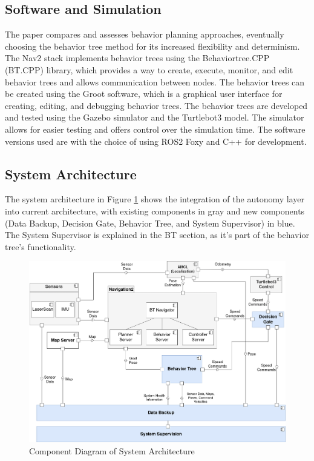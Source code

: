 \documentclass[letterpaper, 10pt, conference]{ieeeconf}
\begin{document}
\subsection{Software and Simulation}

The paper compares and assesses behavior planning approaches, eventually choosing the behavior tree method for its increased flexibility and determinism. The Nav2 stack implements behavior trees using the Behaviortree.CPP (BT.CPP) library, which provides a way to create, execute, monitor, and edit behavior trees and allows communication between nodes. The behavior trees can be created using the Groot software, which is a graphical user interface for creating, editing, and debugging behavior trees. The behavior trees are developed and tested using the Gazebo simulator and the Turtlebot3 model. The simulator allows for easier testing and offers control over the simulation time. The software versions used are with the choice of using ROS2 Foxy and C++ for development.

\subsection{System Architecture}

The system architecture in Figure \ref{fig:component_diagram} shows the integration of the autonomy layer into current architecture, with existing components in gray and new components (Data Backup, Decision Gate, Behavior Tree, and System Supervisor) in blue. The System Supervisor is explained in the BT section, as it's part of the behavior tree's functionality.

\begin{figure}[ht]
	\centering
	\includegraphics[width=0.9\linewidth]{Figures/component_diagram_bt.png}
	\caption{Component Diagram of System Architecture}
	\label{fig:component_diagram}
\end{figure}
\end{document}
